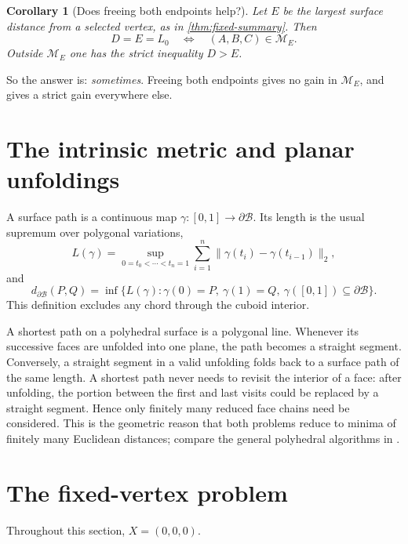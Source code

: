 \documentclass[11pt]{article}
\newtheorem{corollary}[theorem]{Corollary}
\theoremstyle{definition}
\newcommand{\Surf}{\partial\mathcal B}
\newcommand{\distS}{d_{\Surf}}
\begin{document}
\begin{corollary}[Does freeing both endpoints help?]\label{cor:comparison}
Let $E$ be the largest surface distance from a selected vertex, as in
\cref{thm:fixed-summary}.  Then
\[
  D=E=L_0 \quad\Longleftrightarrow\quad (A,B,C)\in\mathcal M_E.
\]
Outside $\mathcal M_E$ one has the strict inequality $D>E$.
\end{corollary}

So the answer is: \emph{sometimes}.  Freeing both endpoints gives no gain in
$\mathcal M_E$, and gives a strict gain everywhere else.

\section{The intrinsic metric and planar unfoldings}

A surface path is a continuous map $\gamma:[0,1]\to\Surf$.  Its length is the
usual supremum over polygonal variations,
\begin{equation}\label{eq:pathlength}
  L(\gamma)=\sup_{0=t_0<\cdots<t_n=1}
  \sum_{i=1}^n \lVert\gamma(t_i)-\gamma(t_{i-1})\rVert_2,
\end{equation}
and
\begin{equation}\label{eq:intrinsic}
  \distS(P,Q)=\inf\{L(\gamma):\gamma(0)=P,\ \gamma(1)=Q,
  \ \gamma([0,1])\subseteq\Surf\}.
\end{equation}
This definition excludes any chord through the cuboid interior.

A shortest path on a polyhedral surface is a polygonal line.  Whenever its
successive faces are unfolded into one plane, the path becomes a straight
segment.  Conversely, a straight segment in a valid unfolding folds back to a
surface path of the same length.  A shortest path never needs to revisit the
interior of a face: after unfolding, the portion between the first and last
visits could be replaced by a straight segment.  Hence only finitely many
reduced face chains need be considered.  This is the geometric reason that
both problems reduce to minima of finitely many Euclidean distances; compare
the general polyhedral algorithms in \cite{orourke1989geodesic}.

\section{The fixed-vertex problem}\label{sec:fixed-proof}

Throughout this section, $X=(0,0,0)$.
\end{document}
